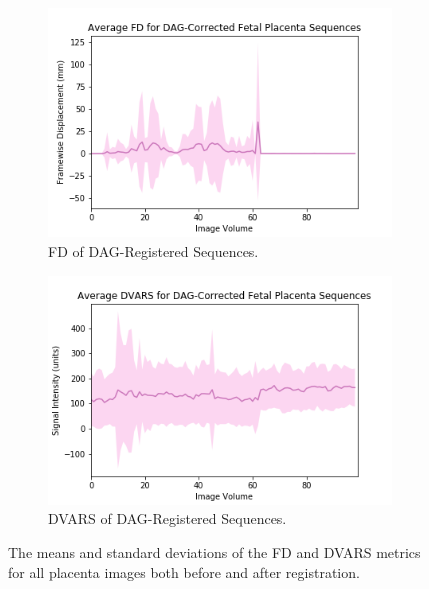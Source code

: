 \begin{figure}[]
	\begin{subfigure}{0.4\textwidth}
		\centering
		\includegraphics[width=1.0\textwidth]{6/figures/fetal-placenta-dag-fd-150.png}
		\caption{FD of DAG-Registered Sequences.}
	\end{subfigure}
	\hspace{0.05\textwidth}
	\begin{subfigure}{0.4\textwidth}
		\centering
		\includegraphics[width=1.0\textwidth]{6/figures/fetal-placenta-dag-dvars-150.png}
		\caption{DVARS of DAG-Registered Sequences.}
	\end{subfigure}
\caption{The means and standard deviations of the FD and DVARS metrics for all placenta images both before and after registration.}
\label{fig:fetal-placenta-power-dists}
\end{figure}

